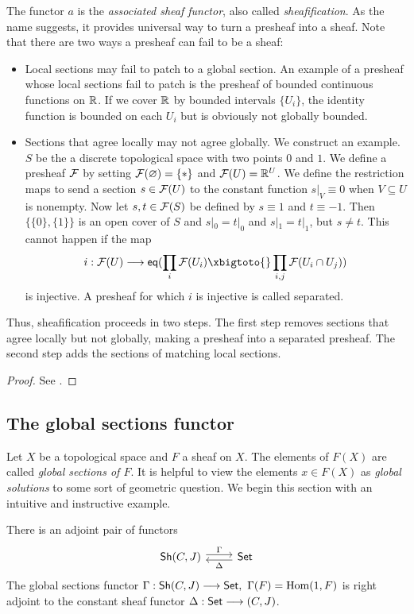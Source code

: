 The functor $a$ is the \textit{associated sheaf functor}, also called \textit{sheafification}. As the name suggests, it provides universal way to turn a presheaf into a sheaf.
Note that there are two ways a presheaf can fail to be a sheaf: 
\begin{itemize}
	\item 
		Local sections may fail to patch to a global section. An example of a presheaf whose local sections fail to patch is the presheaf of bounded continuous functions on $\mathbb{R}$. If we cover $\mathbb{R}$ by bounded intervals $\{U_i\}$, the identity function is bounded on each $U_i$ but is obviously not globally bounded. 
	\item 
		Sections that agree locally may not agree globally. We construct an example. $S$ be the a discrete topological space with two points $0$ and $1$. We define a presheaf $\mathcal{F}$ by setting $\mathcal{F}(\varnothing) = \{*\}$ and $\mathcal{F}(U) = \mathbb{R}^U$. We define the restriction maps to send a section $s \in \mathcal{F}(U)$ to the constant function $s|_V \equiv 0$ when $V \subseteq U$ is nonempty. Now let $s,t \in \mathcal{F}(S)$ be defined by $s \equiv 1$ and $t \equiv -1$. Then $\{\{0\}, \{1\}\}$ is an open cover of $S$ and $s|_{0} = t|_{0}$ and $s|_{1} = t|_{1}$, but $s \neq t$.
		This cannot happen if the map
		\[
			i: \Sh{F}(U) \to \mathsf{eq}(\prod_{i} \Sh{F}(U_i) \xbigtoto{} \prod_{i,j} \Sh{F}(U_i \cap U_j))
		\]
		is injective. A presheaf for which $i$ is injective is called separated.
\end{itemize} 

Thus, sheafification proceeds in two steps. The first step removes sections that agree locally but not globally, making a presheaf into a separated presheaf.  The second step adds the sections of matching local sections. 

\begin{proof}
	See \cite{MacLane/Moerdijk:1994}.
\end{proof}

\subsection{The global sections functor}
Let $X$ be a topological space and $F$ a sheaf on $X$. The elements of $F(X)$ are called \textit{global sections of $F$}. It is helpful to view the elements $x \in F(X)$ as \textit{global solutions} to some sort of geometric question. We begin this section with an intuitive and instructive example.

\begin{theorem}
	There is an adjoint pair of functors
	\[
		\begin{tikzcd}
			{\mathsf{Sh}(C,J)} & \Set
			\arrow["\Delta", shift left=1, from=1-2, to=1-1]
			\arrow["\Gamma", shift left=1, from=1-1, to=1-2]
		\end{tikzcd}
	\]
	The global sections functor $\Gamma: \mathsf{Sh}(C,J) \longrightarrow \mathsf{Set},\ \Gamma(F) = \operatorname{Hom}(1,F)$ is right adjoint to the constant sheaf functor $\Delta: \mathsf{Set} \longrightarrow \mathcal{(}C,J)$.
\end{theorem}

